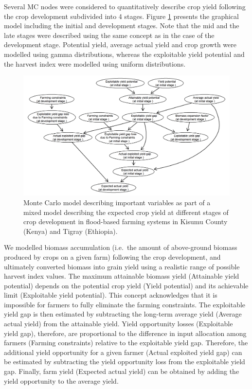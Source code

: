 \documentclass[]{elsarticle} %
\begin{document}
Several MC nodes were considered to quantitatively describe crop yield following the crop development subdivided into 4 stages. Figure \ref{fig:fig9} presents the graphical model including the initial and development stages. Note that the mid and the late stages were described using the same concept as in the case of the development stage. Potential yield, average actual yield and crop growth were modelled using gamma distributions, whereas the exploitable yield potential and the harvest index were modelled using uniform distributions.

\begin{figure}[!h]

{\centering \includegraphics[width=1\linewidth,]{figures/figure_s9} 

}

\caption{Monte Carlo model describing important variables as part of a mixed model describing the expected crop yield at different stages of crop development in flood-based farming systems in Kisumu County (Kenya) and Tigray (Ethiopia).}\label{fig:fig9}
\end{figure}

We modelled biomass accumulation (i.e.~the amount of above-ground biomass produced by crops on a given farm) following the crop development, and ultimately converted biomass into grain yield using a realistic range of possible harvest index values. The maximum attainable biomass yield (Attainable yield potential) depends on the potential crop yield (Yield potential) and its achievable limit (Exploitable yield potential). This concept acknowledges that it is impossible for farmers to fully eliminate the farming constraints. The exploitable yield gap is then estimated by subtracting the long-term average yield (Average actual yield) from the attainable yield. Yield opportunity losses (Exploitable yield gap), therefore, are proportional to the difference in input allocation among farmers (Farming constraints) relative to the exploitable yield gap. Therefore, the additional yield opportunity for a given farmer (Actual exploited yield gap) can be estimated by subtracting the yield opportunity loss from the exploitable yield gap. Finally, farm yield (Expected actual yield) can be obtained by adding the yield opportunity to the average yield.
\end{document}

